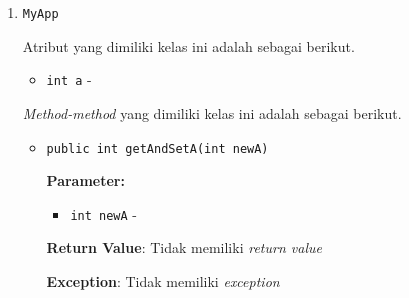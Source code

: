 \documentclass{article}
\begin{document}
\begin{enumerate}
\item \texttt{MyApp}



Atribut yang dimiliki kelas ini adalah sebagai berikut.
\begin{itemize}
\item \texttt{int a} - 
\end{itemize}
\textit{Method-method} yang dimiliki kelas ini adalah sebagai berikut.
\begin{itemize}
\item \texttt{public int getAndSetA(int newA)}



\textbf{Parameter:}
\begin{itemize}
\item \texttt{int newA} - 
\end{itemize}
\textbf{Return Value}: Tidak memiliki \textit{return value}

\textbf{Exception}: Tidak memiliki \textit{exception}

\end{itemize}
\end{enumerate}
\end{document}
